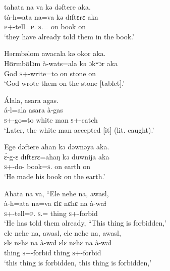  \medskip
  tahata  na  va  kə  dəftere  aka.\\
 \gll tà-h=ata     na=va   kə   dɪftɛrɛ  aka\\
 \textsc{p}+{\PFV}-tell=\textsc{p}.{\IO}   \textsc{s}.{\DO}={\PRF}  on  book  on\\
 \glt ‘they have already told them in the book.’
 \z

\ea Hərmbəlom  awacala  kə  okor  aka.\\
 \gll Hʊrmbʊlɔm   à-wats=ala   kə   ɔkʷɔr   aka\\
 God    \textsc{s}+{\PFV}-write=to  on  stone  on\\
 \glt ‘God wrote them on the stone [tablet].’
 \z

\ea Álala,  asara  agas.\\
 \gll á-l=ala    asara     à-gas\\
 \textsc{s}+{\IFV}-go=to    {white man}  \textsc{s}+{\PFV}-catch\\
 \glt ‘Later, the white man accepted [it] (lit. caught).’
 \z

\ea Ege  dəftere  ahan  kə  dəwnəya  aka.\\
 \gll \`ɛ{}-g-ɛ     dɪftɛrɛ=ahaŋ          kə   duwnija    aka\\
 \textsc{s}+{\PFV}-do-{\CL}  book=\textsc{s}.{\POSS}       on  earth    on\\
 \glt ‘He made his book on the earth.’ 
 \z

\ea Ahata  na  va,  “Ele nehe na, awasl,\\
 \gll à-h=ata   na=va      ɛlɛ     nɛhɛ      na    à-waɬ\\ 
 \textsc{s}+{\PFV}-tell=\textsc{p}.{\IO}   \textsc{s}.{\DO}={\PRF}   thing  {\DEM}  {\PSP}  \textsc{s}+{\PFV}-forbid  \\
 \glt ‘He has told them already, “This thing is forbidden,’\\
 
 \medskip
  ele nehe na, awasl, ele nehe na, awasl,\\
 \gll ɛlɛ       nɛhɛ     na      à-waɬ    ɛlɛ       nɛhɛ       na      à-waɬ \\
 thing    {\DEM}     {\PSP}   \textsc{s}+{\PFV}-forbid  thing    {\DEM}     {\PSP}   \textsc{s}+{\PFV}-forbid    \\
 \glt ‘this thing is forbidden, this thing is forbidden,’\\
 
